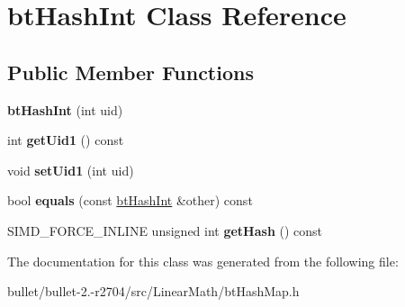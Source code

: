 \hypertarget{classbt_hash_int}{\section{bt\+Hash\+Int Class Reference}
\label{classbt_hash_int}
}
\subsection*{Public Member Functions}
\begin{DoxyCompactItemize}
\item 
\hypertarget{classbt_hash_int_a4d5415d01ef07e62c20ee0e96042c5b6}{{\bfseries bt\+Hash\+Int} (int uid)}\label{classbt_hash_int_a4d5415d01ef07e62c20ee0e96042c5b6}

\item 
\hypertarget{classbt_hash_int_a0173106caafd1193c54cb7875cfaa403}{int {\bfseries get\+Uid1} () const }\label{classbt_hash_int_a0173106caafd1193c54cb7875cfaa403}

\item 
\hypertarget{classbt_hash_int_a19ef17e1fc1e645c10add8125154f954}{void {\bfseries set\+Uid1} (int uid)}\label{classbt_hash_int_a19ef17e1fc1e645c10add8125154f954}

\item 
\hypertarget{classbt_hash_int_ac218bbd782188e1c59918b0977a1547d}{bool {\bfseries equals} (const \hyperlink{classbt_hash_int}{bt\+Hash\+Int} \&other) const }\label{classbt_hash_int_ac218bbd782188e1c59918b0977a1547d}

\item 
\hypertarget{classbt_hash_int_aaacbbd030857ccdfa3bd9e6d155c71ce}{S\+I\+M\+D\+\_\+\+F\+O\+R\+C\+E\+\_\+\+I\+N\+L\+I\+N\+E unsigned int {\bfseries get\+Hash} () const }\label{classbt_hash_int_aaacbbd030857ccdfa3bd9e6d155c71ce}

\end{DoxyCompactItemize}


The documentation for this class was generated from the following file\+:\begin{DoxyCompactItemize}
\item 
bullet/bullet-\/2.-\/r2704/src/\+Linear\+Math/bt\+Hash\+Map.\+h\end{DoxyCompactItemize}
